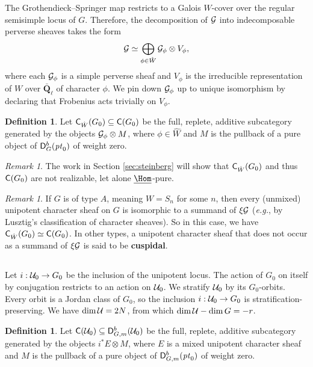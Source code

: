 \documentclass[a4paper,10pt,leqno]{amsart}
\theoremstyle{plain}
\theoremstyle{plain}
\theoremstyle{plain}
\theoremstyle{definition}
\newtheorem{df}[thm]{Definition}
\theoremstyle{remark}
\newtheorem{rem}[thm]{Remark}
\newcommand{\dfemph}[1]{\textbf{#1}}
\newcommand{\QL}{\bar{\mathbf{Q}}_\ell}
\newcommand{\point}{\mathit{pt}}
\begin{document}
The Grothendieck--Springer map restricts to a Galois $W$-cover over the regular semisimple locus of $G$.
Therefore, the decomposition of $\cal{G}$ into indecomposable perverse sheaves takes the form
\begin{align}
\cal{G} \simeq \bigoplus_{\phi \in \hat{W}} \cal{G}_\phi \otimes V_\phi,
\end{align}
where each $\cal{G}_\phi$ is a simple perverse sheaf and $V_\phi$ is the irreducible representation of $W$ over $\QL$ of character $\phi$.
We pin down $\cal{G}_\phi$ up to unique isomorphism by declaring that Frobenius acts trivially on $V_\phi$.

\begin{df}
Let $\sf{C}_{\hat{W}}(G_0) \subseteq \sf{C}(G_0)$ be the full, replete, additive subcategory generated by the objects $\cal{G}_\phi \otimes M$, where $\phi \in \hat{W}$ and $M$ is the pullback of a pure object of $\sf{D}_G^b(\point_0)$ of weight zero.
\end{df}

\begin{rem}
The work in Section \ref{sec:steinberg} will show that $\sf{C}_{\hat{W}}(G_0)$ and thus $\sf{C}(G_0)$ are not realizable, let alone $\SHom$-pure.
\end{rem}

\begin{rem}
If $G$ is of type $A$, meaning $W = S_n$ for some $n$, then every (unmixed) unipotent character sheaf on $G$ is isomorphic to a summand of $\xi\cal{G}$ (\emph{e.g.}, by Lusztig's classification of character sheaves).
So in this case, we have $\sf{C}_{\hat{W}}(G_0) \simeq \sf{C}(G_0)$.
In other types, a unipotent character sheaf that does not occur as a summand of $\xi \cal{G}$ is said to be \dfemph{cuspidal}.
\end{rem}

\subsection{}

Let $i : \cal{U}_0 \to G_0$ be the inclusion of the unipotent locus.
The action of $G_0$ on itself by conjugation restricts to an action on $\cal{U}_0$.
We stratify $\cal{U}_0$ by its $G_0$-orbits.
Every orbit is a Jordan class of $G_0$, so the inclusion $i : \cal{U}_0 \to G_0$ is stratification-preserving.
We have $\dim \cal{U} = 2N$, from which $\dim \cal{U} - \dim G = -r$.

\begin{df}\label{df:unipotent}
Let $\sf{C}(\cal{U}_0) \subseteq \sf{D}_{G, m}^b(\cal{U}_0)$ be the full, replete, additive subcategory generated by the objects $i^\ast E \otimes M$, where $E$ is a mixed unipotent character sheaf and $M$ is the pullback of a pure object of $\sf{D}_{G, m}^b(\point_0)$ of weight zero.
\end{df}
\end{document}
